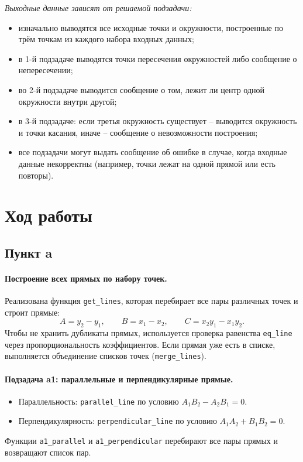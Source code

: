 \documentclass[a4paper, 11pt]{article}
\begin{document}
\textit{Выходные данные зависят от решаемой подзадачи:}
\begin{itemize}
  \item изначально выводятся все исходные точки и окружности, построенные по трём точкам из каждого набора входных данных;
  \item в 1-й подзадаче выводятся точки пересечения окружностей либо сообщение о непересечении;
  \item во 2-й подзадаче выводится сообщение о том, лежит ли центр одной окружности внутри другой;
  \item в 3-й подзадаче: если третья окружность существует – выводится окружность и точки касания, иначе – сообщение о невозможности построения;
  \item все подзадачи могут выдать сообщение об ошибке в случае, когда входные данные некорректны (например, точки лежат на одной прямой или есть повторы).
\end{itemize}

\newpage
\section{Ход работы}

\subsection*{Пункт a}
\paragraph{Построение всех прямых по набору точек.}
Реализована функция \texttt{get\_lines}, которая перебирает все пары различных точек и строит прямые:
\[
A = y_2-y_1,\qquad B = x_1-x_2,\qquad C = x_2y_1 - x_1y_2.
\]
Чтобы не хранить дубликаты прямых, используется проверка равенства \texttt{eq\_line} через пропорциональность коэффициентов.
Если прямая уже есть в списке, выполняется объединение списков точек (\texttt{merge\_lines}).

\paragraph{Подзадача a1: параллельные и перпендикулярные прямые.}
\begin{itemize}
  \item Параллельность: \texttt{parallel\_line} по условию $A_1B_2 - A_2B_1 = 0$.
  \item Перпендикулярность: \texttt{perpendicular\_line} по условию $A_1A_2 + B_1B_2 = 0$.
\end{itemize}
Функции \texttt{a1\_parallel} и \texttt{a1\_perpendicular} перебирают все пары прямых и возвращают список пар.
\end{document}
